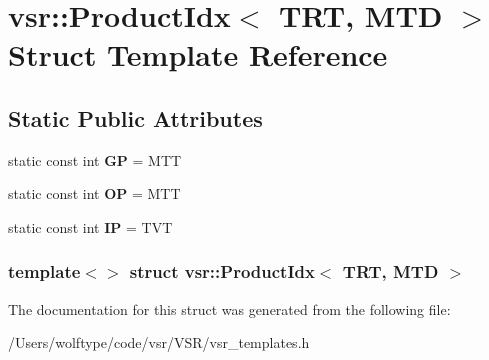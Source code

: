 \hypertarget{structvsr_1_1_product_idx_3_01_t_r_t_00_01_m_t_d_01_4}{\section{vsr\-:\-:Product\-Idx$<$ T\-R\-T, M\-T\-D $>$ Struct Template Reference}
\label{structvsr_1_1_product_idx_3_01_t_r_t_00_01_m_t_d_01_4}
}
\subsection*{Static Public Attributes}
\begin{DoxyCompactItemize}
\item 
\hypertarget{structvsr_1_1_product_idx_3_01_t_r_t_00_01_m_t_d_01_4_a24211c5c4d4092d992e1c4f481f41c7b}{static const int {\bfseries G\-P} = M\-T\-T}\label{structvsr_1_1_product_idx_3_01_t_r_t_00_01_m_t_d_01_4_a24211c5c4d4092d992e1c4f481f41c7b}

\item 
\hypertarget{structvsr_1_1_product_idx_3_01_t_r_t_00_01_m_t_d_01_4_a7369a32070d888291a056c8910de8496}{static const int {\bfseries O\-P} = M\-T\-T}\label{structvsr_1_1_product_idx_3_01_t_r_t_00_01_m_t_d_01_4_a7369a32070d888291a056c8910de8496}

\item 
\hypertarget{structvsr_1_1_product_idx_3_01_t_r_t_00_01_m_t_d_01_4_a6121259687a7e573c8a85221cb251a5d}{static const int {\bfseries I\-P} = T\-V\-T}\label{structvsr_1_1_product_idx_3_01_t_r_t_00_01_m_t_d_01_4_a6121259687a7e573c8a85221cb251a5d}

\end{DoxyCompactItemize}
\subsubsection*{template$<$$>$ struct vsr\-::\-Product\-Idx$<$ T\-R\-T, M\-T\-D $>$}



The documentation for this struct was generated from the following file\-:\begin{DoxyCompactItemize}
\item 
/\-Users/wolftype/code/vsr/\-V\-S\-R/vsr\-\_\-templates.\-h\end{DoxyCompactItemize}
